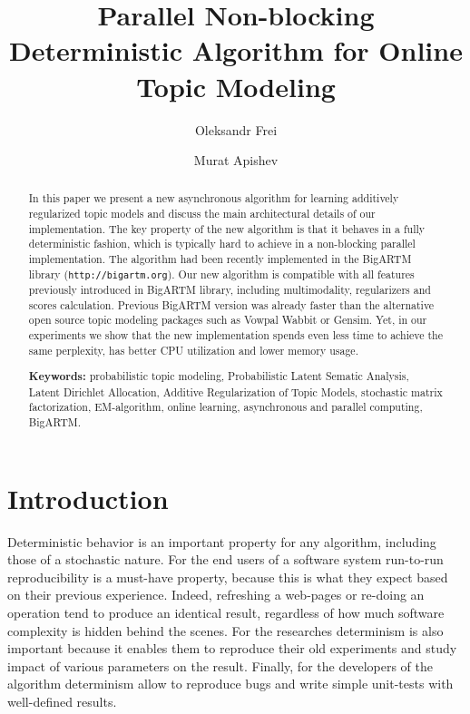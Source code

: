 \documentclass[russian,english]{llncs}
\begin{document}
\title{
    Parallel Non-blocking Deterministic Algorithm for Online Topic Modeling
}
\author{
    Oleksandr Frei
    \and
    Murat Apishev
}

\maketitle

\begin{abstract}
In this paper we present a new asynchronous algorithm for learning additively regularized topic models
and discuss the main architectural details of our implementation.
The key property of the new algorithm is that it behaves in a fully deterministic fashion,
which is typically hard to achieve in a non-blocking parallel implementation. The algorithm
had been
recently implemented in the BigARTM library (\texttt{http://bigartm.org}).
Our new algorithm is compatible with all features previously introduced in BigARTM library,
including multimodality, regularizers and scores calculation.
Previous BigARTM version was already faster than the alternative open source topic modeling packages such as Vowpal Wabbit or Gensim.
Yet, in our experiments we show that the new implementation spends even less time to achieve the same perplexity, has better CPU utilization and lower memory usage.

\vspace{1em}
\textbf{Keywords:}
    probabilistic topic modeling,
    Probabilistic Latent Sematic Analysis,
    Latent Dirichlet Allocation,
    Additive Regularization of Topic Models,
    stochastic matrix factorization,
    EM-algorithm,
    online learning,
    asynchronous and parallel computing,
    BigARTM.
\end{abstract}

\section{Introduction}

Deterministic behavior is an important property for any algorithm,
including those of a stochastic nature.
For the end users of a software system run-to-run reproducibility is a must-have property,
because this is what they expect based on their previous experience.
Indeed, refreshing a web-pages or re-doing an operation tend to
produce an identical result, regardless of how much software complexity is hidden behind the scenes.
For the researches determinism is also important
because it enables them to reproduce their old experiments
and study impact of various parameters on the result.
Finally, for the developers of the algorithm
determinism allow to reproduce bugs and write simple unit-tests with well-defined results.
\end{document}
